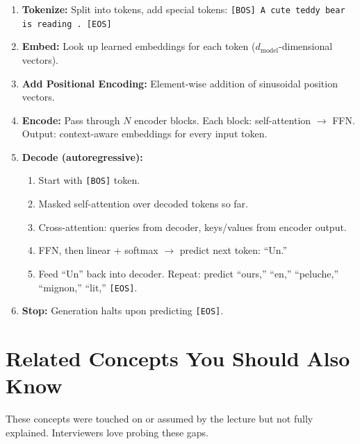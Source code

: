 \documentclass[11pt, a4paper]{article}
\begin{document}
\begin{enumerate}[leftmargin=2em]
  \item \textbf{Tokenize:} Split into tokens, add special tokens: \texttt{[BOS] A cute teddy bear is reading . [EOS]}
  \item \textbf{Embed:} Look up learned embeddings for each token ($d_{\text{model}}$-dimensional vectors).
  \item \textbf{Add Positional Encoding:} Element-wise addition of sinusoidal position vectors.
  \item \textbf{Encode:} Pass through $N$ encoder blocks. Each block: self-attention $\to$ FFN. Output: context-aware embeddings for every input token.
  \item \textbf{Decode (autoregressive):}
    \begin{enumerate}[label=(\alph*)]
      \item Start with \texttt{[BOS]} token.
      \item Masked self-attention over decoded tokens so far.
      \item Cross-attention: queries from decoder, keys/values from encoder output.
      \item FFN, then linear + softmax $\to$ predict next token: ``Un.''
      \item Feed ``Un'' back into decoder. Repeat: predict ``ours,'' ``en,'' ``peluche,'' ``mignon,'' ``lit,'' \texttt{[EOS]}.
    \end{enumerate}
  \item \textbf{Stop:} Generation halts upon predicting \texttt{[EOS]}.
\end{enumerate}

\newpage
\section{Related Concepts You Should Also Know}

These concepts were touched on or assumed by the lecture but not fully explained. Interviewers love probing these gaps.
\end{document}

